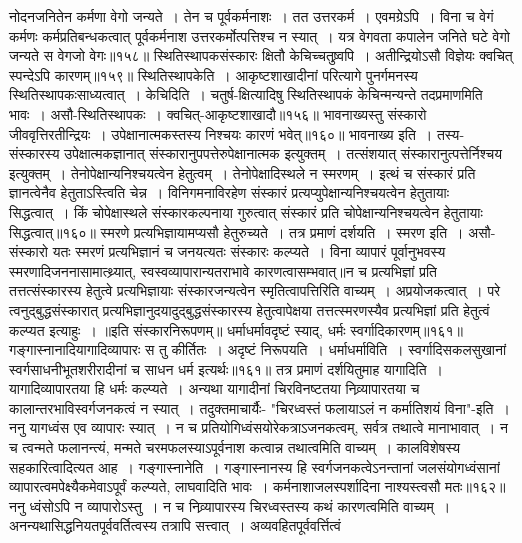 नोदनजनितेन कर्मणा वेगो जन्यते~। तेन च पूर्वकर्मनाशः~। तत उत्तरकर्म~। एवमग्रेऽपि~। विना च वेगं कर्मणः कर्मप्रतिबन्धकत्वात् पूर्वकर्मनाश उत्तरकर्मोत्पत्तिश्च न
स्यात्~। यत्र वेगवता कपालेन जनिते घटे वेगो जन्यते स वेगजो वेगः॥१५८॥
स्थितिस्थापकसंस्कारः क्षितौ केचिच्चतुष्र्वपि~।
अतीन्द्रियोऽसौ विज्ञेयः क्वचित् स्पन्देऽपि कारणम्॥१५९॥
स्थितिस्थापकेति~। आकृष्टशाखादीनां परित्यागे पुनर्गमनस्य स्थितिस्थापकःसाध्यत्वात्~। केचिदिति~। चतुर्ष-क्षित्यादिषु स्थितिस्थापकं केचिन्मन्यन्ते तदप्रमाणमिति
भावः~। असौ-स्थितिस्थापकः~। क्वचित्-आकृष्टशाखादौ॥१५६॥
भावनाख्यस्तु संस्कारो जीववृत्तिरतीन्द्रियः~।
उपेक्षानात्मकस्तस्य निश्चयः कारणं भवेत्॥१६०॥
भावनाख्य इति~। तस्य-संस्कारस्य उपेक्षात्मकज्ञानात् संस्कारानुपपत्तेरुपेक्षानात्मक इत्युक्तम्~। तत्संशयात् संस्कारानुत्पत्तेर्निश्चय इत्युक्तम्~। तेनोपेक्षान्यनिश्चयत्वेन
हेतुत्वम्~। तेनोपेक्षादिस्थले न स्मरणम्~। इत्थं च संस्कारं प्रति ज्ञानत्वेनैव हेतुताऽस्त्विति चेन्न~। विनिगमनाविरहेण संस्कारं प्रत्यप्युपेक्षान्यनिश्चयत्वेन हेतुतायाः
सिद्धत्वात्~। किं चोपेक्षास्थले संस्कारकल्पनाया गुरुत्वात् संस्कारं प्रति चोपेक्षान्यनिश्चयत्वेन हेतुतायाः सिद्धत्वात्॥१६०॥
स्मरणे प्रत्यभिज्ञायामप्यसौ हेतुरुच्यते~।
तत्र प्रमाणं दर्शयति~। स्मरण इति~। असौ-संस्कारो यतः स्मरणं प्रत्यभिज्ञानं च जनयत्यतः संस्कारः कल्प्यते~। विना व्यापारं पूर्वानुभवस्य स्मरणादिजननासामात्थ्र्यात्,
स्वस्वव्यापारान्यतराभावे कारणत्वासम्भवात्॥न च प्रत्यभिज्ञां प्रति तत्तत्संस्कारस्य हेतुत्वे प्रत्यभिज्ञायाः संस्कारजन्यत्वेन स्मृतित्वापत्तिरिति वाच्यम्~। अप्रयोजकत्वात्~।
परे त्वनुद्बुद्धसंस्कारात् प्रत्यभिज्ञानुदयादुद्बुद्धसंस्कारस्य हेतुत्वापेक्षया तत्तत्स्मरणस्यैव प्रत्यभिज्ञां प्रति हेतुत्वं कल्प्यत इत्याहुः~।
॥इति संस्कारनिरूपणम्॥
धर्माधर्मावदृष्टं स्याद्, धर्मः स्वर्गादिकारणम्॥१६१॥
गङ्गास्नानादियागादिव्यापारः स तु कीर्तितः~।
अदृष्टं निरूपयति~। धर्माधर्माविति~। स्वर्गादिसकलसुखानां स्वर्गसाधनीभूतशरीरादीनां च साधन धर्म इत्यर्थः॥१६१॥
तत्र प्रमाणं दर्शयितुमाह यागादिति~। यागादिव्यापारतया हि धर्मः कल्प्यते~। अन्यथा यागादीनां चिरविनष्टतया निव्र्यापारतया च कालान्तरभाविस्वर्गजनकत्वं न
स्यात्~। तदुक्तमाचार्यैः-
"चिरध्वस्तं फलायाऽलं न कर्मातिशयं विना"-इति~।
ननु यागध्वंस एव व्यापारः स्यात्~। न च प्रतियोगिध्वंसयोरेकत्राऽजनकत्वम्, सर्वत्र तथात्वे मानाभावात्~। न च त्वन्मते फलानन्त्यं, मन्मते चरमफलस्याऽपूर्वनाश
कत्वान्न तथात्वमिति वाच्यम्~। कालविशेषस्य सहकारित्वादित्यत आह~। गङ्गास्नानेति~। गङ्गास्नानस्य हि स्वर्गजनकत्वेऽनन्तानां जलसंयोगध्वंसानां व्यापारत्वमपेक्ष्यैकमेवाऽपूर्वं
कल्प्यते, लाघवादिति भावः~।
कर्मनाशाजलस्पर्शादिना नाश्यस्त्वसौ मतः॥१६२॥
ननु ध्वंसोऽपि न व्यापारोऽस्तु~। न च निव्र्यापारस्य चिरध्वस्तस्य कथं कारणत्वमिति वाच्यम्~। अनन्यथासिद्धनियतपूर्ववर्तित्वस्य तत्रापि सत्त्वात्~। अव्यवहितपूर्ववर्त्तित्वं
